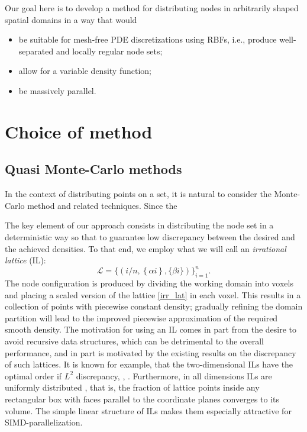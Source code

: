 \documentclass{amsart}
\newcommand{\lat}{\mathcal{L}}
\theoremstyle{definition}
\begin{document}
Our goal here is to develop a method for distributing nodes in arbitrarily shaped spatial domains in a way that would 
\begin{itemize}
 \item be suitable for mesh-free PDE discretizations using RBFs, i.e., produce well-separated and locally regular node sets;
 \item allow for a variable density function;
 \item be massively parallel.
\end{itemize}

\section{Choice of method}
\subsection{Quasi Monte-Carlo methods}
In the context of distributing points on a set, it is natural to consider the Monte-Carlo method and related techniques. Since the 

The key element of our approach consists in distributing the node set in a deterministic way so that to guarantee low discrepancy between the desired and the achieved densities. 
To that end, we employ what we will call an \textit{irrational lattice} (IL):
\begin{equation}\label{irr_lat}
	\lat = \bigg\{\left({i}/{n}, \left\{\alpha{i} \right\}, \{ \beta {i}  \}\right)\bigg\}_{i=1}^n.
\end{equation} 
The node configuration is produced by dividing the working domain into voxels and placing a scaled version of the lattice \eqref{irr_lat} in each voxel. This results in a collection of points with piecewise constant density; gradually refining the domain partition will lead to the improved piecewise approximation of the required smooth density. The motivation for using an IL comes in part from the desire to avoid recursive data structures, which can be detrimental to the overall performance, and in part is motivated by the existing results on the discrepancy of such lattices. It is known for example, that the two-dimensional ILs have the optimal order if $ L^2 $ discrepancy, \cite{Bilyk2012}, \cite{Bilyk2013}. Furthermore, in all dimensions ILs are uniformly distributed \cite[Chapter 1.6]{Kuipers2006}, that is, the fraction of lattice points inside any rectangular box with faces parallel to the coordinate planes converges to its volume. The simple linear structure of ILs makes them especially attractive for SIMD-parallelization.
\end{document}
